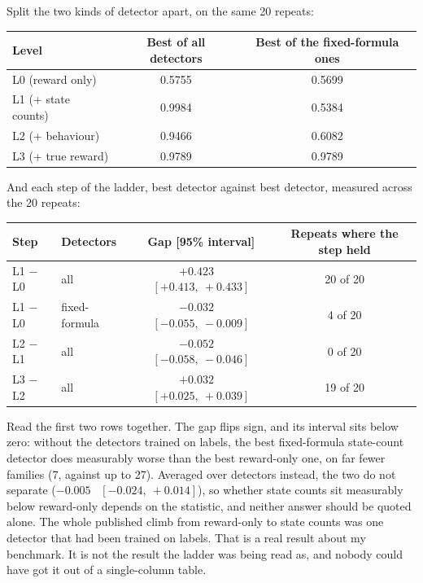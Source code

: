 \documentclass[11pt,a4paper]{article}
\begin{document}
Split the two kinds of detector apart, on the same 20 repeats:

\vspace{0.3em}
\begin{tabular}{@{}lcc@{}}
\toprule
Level & Best of all detectors & Best of the fixed-formula ones \\
\midrule
L0 (reward only)      & 0.5755 & 0.5699 \\
L1 (+ state counts)   & 0.9984 & 0.5384 \\
L2 (+ behaviour)      & 0.9466 & 0.6082 \\
L3 (+ true reward)    & 0.9789 & 0.9789 \\
\bottomrule
\end{tabular}
\vspace{0.3em}

And each step of the ladder, best detector against best detector, measured across the
20 repeats:

\vspace{0.3em}
\begin{tabular}{@{}llcc@{}}
\toprule
Step & Detectors & Gap [95\% interval] & Repeats where the step held \\
\midrule
L1 $-$ L0 & all            & $+0.423$ \ $[+0.413,\ +0.433]$ & 20 of 20 \\
L1 $-$ L0 & fixed-formula  & $-0.032$ \ $[-0.055,\ -0.009]$ & 4 of 20 \\
\addlinespace
L2 $-$ L1 & all            & $-0.052$ \ $[-0.058,\ -0.046]$ & 0 of 20 \\
L3 $-$ L2 & all            & $+0.032$ \ $[+0.025,\ +0.039]$ & 19 of 20 \\
\bottomrule
\end{tabular}
\vspace{0.3em}

Read the first two rows together. The gap flips sign, and its interval sits below
zero: without the detectors trained on labels, the best fixed-formula state-count
detector does measurably worse than the best reward-only one, on far fewer families
(7, against up to 27). Averaged over detectors instead, the two do not separate
($-0.005$ \ $[-0.024,\ +0.014]$), so whether state counts sit measurably below
reward-only depends on the statistic, and neither answer should be quoted alone. The
whole published climb from reward-only to state counts was one detector that had been
trained on labels. That is a real result about my benchmark. It is not the result the
ladder was being read as, and nobody could have got it out of a single-column table.
\end{document}
